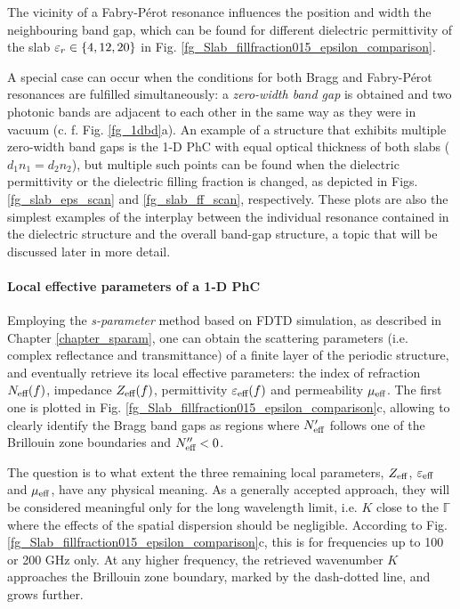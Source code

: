 The vicinity of a Fabry-Pérot resonance influences the position and width the neighbouring band gap, which can be found for different dielectric permittivity of the slab $\varepsilon_r\in\{4,12,20\}$ in Fig. \ref{fg_Slab_fillfraction015_epsilon_comparison}.

A special case can occur when the conditions for both Bragg and Fabry-Pérot resonances are fulfilled simultaneously: a \textit{zero-width band gap} is obtained and two photonic bands are adjacent to each other in the same way as they were in vacuum (c. f. Fig. \ref{fg_1dbd}a). An example of a structure that exhibits multiple zero-width band gaps is the 1-D PhC with equal optical thickness of both slabs ($d_1 n_1 = d_2 n_2$), but multiple such points can be found when the dielectric permittivity or the dielectric filling fraction is changed, as depicted in Figs. \ref{fg_slab_eps_scan} and \ref{fg_slab_ff_scan}, respectively. These plots are also the simplest examples of the interplay between the individual resonance contained in the dielectric structure and the overall band-gap structure, a topic that will be discussed later in more detail.

\paragraph{Local effective parameters of a 1-D PhC}
Employing the \textit{s-parameter} method based on FDTD simulation, as described in Chapter \ref{chapter_sparam}, one can obtain the scattering parameters (i.e. complex reflectance and transmittance) of a finite layer of the periodic structure, and eventually retrieve its local effective parameters: the index of refraction $N_{\text{eff} }(f)$, impedance $Z_{\text{eff} }(f)$, permittivity $\varepsilon_{\text{eff} }(f)$ and permeability $\mu_{\text{eff} }$. The first one is plotted in Fig. \ref{fg_Slab_fillfraction015_epsilon_comparison}c, allowing to clearly identify the Bragg band gaps as regions where $N_{\text{eff} }'$ follows one of the Brillouin zone boundaries and $N_{\text{eff} }'' < 0$.

The question is to what extent the three remaining local parameters, $Z_{\text{eff} }$, $\varepsilon_{\text{eff} }$ and $\mu_{\text{eff} }$, have any physical meaning. As a generally accepted approach, they will be considered meaningful only for the long wavelength limit, i.e. $K$ close to the $\mathbb{\Gamma}$ where the effects of the spatial dispersion should be negligible. According to Fig. \ref{fg_Slab_fillfraction015_epsilon_comparison}c, this is for frequencies up to 100 or 200 GHz only. At any higher frequency, the retrieved wavenumber $K$ approaches the Brillouin zone boundary, marked by the dash-dotted line, and grows further.


